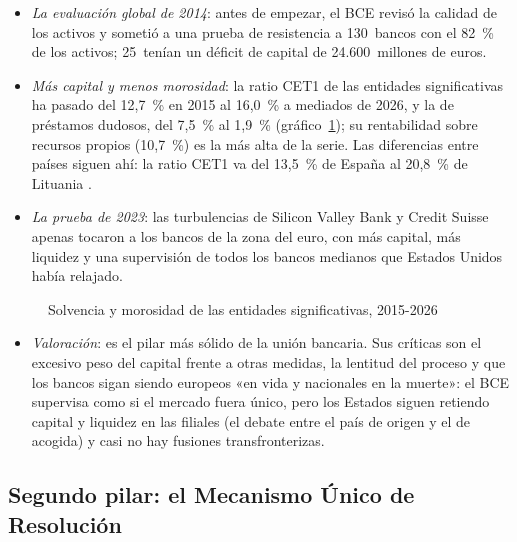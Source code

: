 \documentclass[11pt]{article}
\begin{document}
\begin{itemize}
\item \emph{La evaluación global de 2014}: antes de empezar, el BCE revisó la calidad de los activos y sometió a una prueba de resistencia a 130~bancos con el 82~\% de los activos; 25~tenían un déficit de capital de 24.600~millones de euros\nocite{BCE2014EvaluacionGlobal}.
\item \emph{Más capital y menos morosidad}: la ratio CET1 de las entidades significativas ha pasado del 12,7~\% en 2015 al 16,0~\% a mediados de 2026, y la de préstamos dudosos, del 7,5~\% al 1,9~\% (gráfico~\ref{fig:solvencia}); su rentabilidad sobre recursos propios (10,7~\%) es la más alta de la serie\nocite{BCE2026SupervisionSI}. Las diferencias entre países siguen ahí: la ratio CET1 va del 13,5~\% de España al 20,8~\% de Lituania .
\item \emph{La prueba de 2023}: las turbulencias de Silicon Valley Bank y Credit Suisse apenas tocaron a los bancos de la zona del euro, con más capital, más liquidez y una supervisión de todos los bancos medianos que Estados Unidos había relajado.
\end{itemize}

\begin{figure}[H]
\centering
\caption{Solvencia y morosidad de las entidades significativas, 2015-2026}\label{fig:solvencia}
\end{figure}

\begin{itemize}
\item \emph{Valoración}: es el pilar más sólido de la unión bancaria. Sus críticas son el excesivo peso del capital frente a otras medidas, la lentitud del proceso y que los bancos sigan siendo europeos «en vida y nacionales en la muerte»: el BCE supervisa como si el mercado fuera único, pero los Estados siguen retiendo capital y liquidez en las filiales (el debate entre el país de origen y el de acogida) y casi no hay fusiones transfronterizas.
\end{itemize}

\subsection{Segundo pilar:\cortetitulo{} el Mecanismo Único de Resolución}\label{sec:mur}
\end{document}
